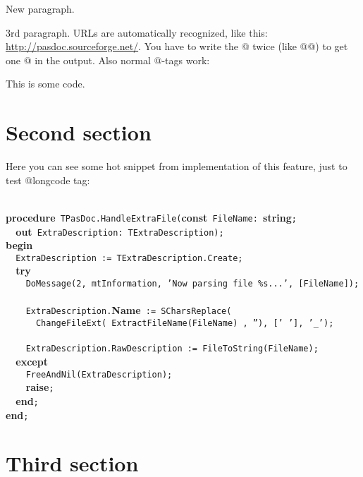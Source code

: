 \documentclass{report}
\begin{document}
New paragraph.

3rd paragraph. URLs are automatically recognized, like this: \href{http://pasdoc.sourceforge.net/}{http://pasdoc.sourceforge.net/}. You have to write the @ twice (like @@) to get one @ in the output. Also normal @{-}tags work: \begin{ttfamily}This is some code.\end{ttfamily}

\label{SecSecond}
\section{Second section}


Here you can see some hot snippet from implementation of this feature, just to test @longcode tag:

\texttt{\\\nopagebreak[3]
}\textbf{procedure}\texttt{~TPasDoc.HandleExtraFile(}\textbf{const}\texttt{~FileName:~}\textbf{string}\texttt{;\\\nopagebreak[3]
~~}\textbf{out}\texttt{~ExtraDescription:~TExtraDescription);\\\nopagebreak[3]
}\textbf{begin}\texttt{\\\nopagebreak[3]
~~ExtraDescription~:=~TExtraDescription.Create;\\\nopagebreak[3]
~~}\textbf{try}\texttt{\\\nopagebreak[3]
~~~~DoMessage(2,~mtInformation,~'Now~parsing~file~{\%}s...',~[FileName]);\\\nopagebreak[3]
\\\nopagebreak[3]
~~~~ExtraDescription.}\textbf{Name}\texttt{~:=~SCharsReplace(\\\nopagebreak[3]
~~~~~~ChangeFileExt(~ExtractFileName(FileName)~,~''),~['~'],~'{\_}');\\\nopagebreak[3]
\\\nopagebreak[3]
~~~~ExtraDescription.RawDescription~:=~FileToString(FileName);\\\nopagebreak[3]
~~}\textbf{except}\texttt{\\\nopagebreak[3]
~~~~FreeAndNil(ExtraDescription);\\\nopagebreak[3]
~~~~}\textbf{raise}\texttt{;\\\nopagebreak[3]
~~}\textbf{end}\texttt{;\\\nopagebreak[3]
}\textbf{end}\texttt{;\\
}

\label{ThirdSecond}
\section{Third section}
\end{document}
